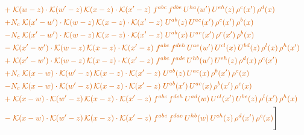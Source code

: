 \documentclass[10pt]{article}
\numberwithin{equation}{section}
\begin{document}
\begin{align}
&\quad{\color{BFK}+\;\mathcal{K}(w-z)\cdot\mathcal{K}(w'-z)\,\mathcal{K}(x-z)\cdot\mathcal{K}(x'-z)\;f^{abc}\,f^{dbe}\,U^{ha}(w')\,U^{eh}(z)\,\rho^{c}(x')\,\rho^{d}(x)}\notag\\
&\quad{\color{BFK}+N_c\;\mathcal{K}(x'-w')\cdot\mathcal{K}(w-z)\,\mathcal{K}(x-z)\cdot\mathcal{K}(x'-z)\;U^{ab}(z)\,U^{ac}(x')\,\rho^{c}(x')\,\rho^{b}(x)}\notag\\
&\quad{\color{BFK}-N_c\;\mathcal{K}(x'-w')\cdot\mathcal{K}(w-z)\,\mathcal{K}(x-z)\cdot\mathcal{K}(x'-z)\;U^{ab}(x)\,U^{ac}(x')\,\rho^{c}(x')\,\rho^{b}(x)}\notag\\
&\quad{\color{BFK}-\;\mathcal{K}(x'-w')\cdot\mathcal{K}(w-z)\,\mathcal{K}(x-z)\cdot\mathcal{K}(x'-z)\;f^{abc}\,f^{deh}\,U^{ae}(w')\,U^{cl}(x)\,U^{bd}(z)\,\rho^{l}(x)\,\rho^{h}(x')}\notag\\
&\quad{\color{BFK}+\;\mathcal{K}(x'-w')\cdot\mathcal{K}(w-z)\,\mathcal{K}(x-z)\cdot\mathcal{K}(x'-z)\;f^{abc}\,f^{ade}\,U^{hb}(w')\,U^{eh}(z)\,\rho^{d}(x)\,\rho^{c}(x')}\notag\\
&\quad{\color{BFK}+N_c\;\mathcal{K}(x-w)\cdot\mathcal{K}(w'-z)\,\mathcal{K}(x-z)\cdot\mathcal{K}(x'-z)\;U^{ab}(z)\,U^{ac}(x)\,\rho^{b}(x')\,\rho^{c}(x)}\notag\\
&\quad{\color{BFK}-N_c\;\mathcal{K}(x-w)\cdot\mathcal{K}(w'-z)\,\mathcal{K}(x-z)\cdot\mathcal{K}(x'-z)\;U^{ab}(x')\,U^{ac}(x)\,\rho^{b}(x')\,\rho^{c}(x)}\notag\\
&\quad{\color{BFK}+\;\mathcal{K}(x-w)\cdot\mathcal{K}(w'-z)\,\mathcal{K}(x-z)\cdot\mathcal{K}(x'-z)\;f^{abc}\,f^{deh}\,U^{ad}(w)\,U^{cl}(x')\,U^{be}(z)\,\rho^{l}(x')\,\rho^{h}(x)}\notag\\
&\quad{\color{BFK}-\;\mathcal{K}(x-w)\cdot\mathcal{K}(w'-z)\,\mathcal{K}(x-z)\cdot\mathcal{K}(x'-z)\;f^{abc}\,f^{dae}\,U^{hb}(w)\,U^{eh}(z)\,\rho^{d}(x')\,\rho^{c}(x)}\Bigg]\label{eq:P11}
\end{align}
\end{document}
